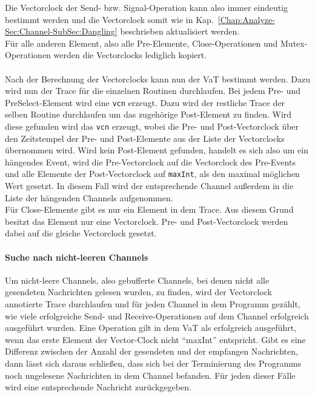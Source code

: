 Die Vectorclock der Send- bzw. Signal-Operation kann also immer eindeutig bestimmt 
werden und die Vectorclock somit wie in Kap.~\ref{Chap:Analyze-Sec:Channel-SubSec:Dangling}
beschrieben aktualisiert werden.\\
Für alle anderen Element, also alle Pre-Elemente, Close-Operationen und Mutex-Operationen 
werden die Vectorclocks lediglich kopiert.\\\\
Nach der Berechnung der Vectorclocks kann nun der VaT bestimmt werden. 
Dazu wird nun der Trace für die einzelnen Routinen durchlaufen. Bei jedem 
Pre- und PreSelect-Element wird eine \texttt{vcn} erzeugt. Dazu wird der restliche Trace 
der selben Routine durchlaufen um das zugehörige Post-Element zu finden. 
Wird diese gefunden wird 
das \texttt{vcn} erzeugt, wobei die Pre- und Post-Vectorclock über den 
Zeitstempel der Pre- und Post-Elemente aus der Liste der Vectorclocks 
übernommen wird.
Wird kein Post-Element gefunden, handelt es sich also um ein hängendes Event, 
wird die Pre-Vectorclock auf die Vectorclock des Pre-Events und alle Elemente 
der Post-Vectorclock auf \texttt{maxInt}, als den maximal möglichen Wert 
gesetzt. In diesem Fall wird der entsprechende Channel außerdem in die Liste der
hängenden Channels aufgenommen. 
\\
Für Close-Elemente gibt es nur ein Element in dem Trace. Aus diesem Grund 
besitzt das Element nur eine Vectorclock. Pre- und Post-Vectorclock werden 
dabei auf die gleiche Vectorclock gesetzt.

\paragraph{Suche nach nicht-leeren Channels} 
Um nicht-leere Channels, also gebufferte Channels, bei denen nicht alle 
gesendeten Nachrichten gelesen wurden, zu finden, wird der Vectorclock annotierte
Trace durchlaufen und für jeden Channel in dem Programm gezählt, wie viele 
erfolgreiche Send- und Receive-Operationen auf dem Channel erfolgreich ausgeführt 
wurden. Eine Operation gilt in dem VaT als erfolgreich ausgeführt, wenn 
das erste Element der Vector-Clock nicht ``maxInt'' entspricht. Gibt es 
eine Differenz zwischen der Anzahl der gesendeten und der empfangen Nachrichten, 
dann lässt sich daraus schließen, dass sich bei der Terminierung des 
Programms noch ungelesene Nachrichten in dem Channel befanden.
Für jeden dieser Fälle wird eine entsprechende Nachricht zurückgegeben. 


